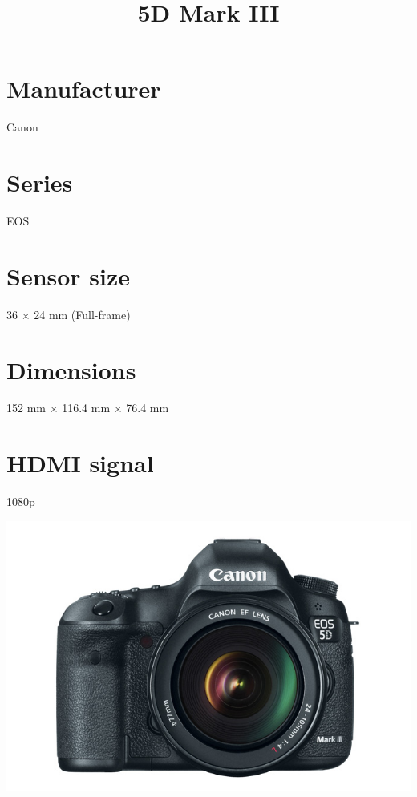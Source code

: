 \documentclass{article}
\begin{document}
\usepackage{titlesec}
\usepackage{graphicx}


\title{5D Mark III}
\section{Manufacturer}
Canon
\section{Series}
EOS
\section{Sensor size}
36 × 24 mm (Full-frame)
\section{Dimensions}
152 mm × 116.4 mm × 76.4 mm
\section{HDMI signal}
1080p


\includegraphics[width=\textwidth]{5d-mark-III.jpg}
\end{document}
